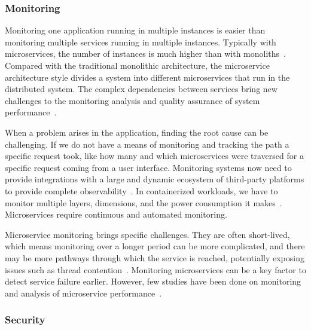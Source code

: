 \subsubsection{Monitoring}%


Monitoring one application running in multiple instances is easier than monitoring multiple services running in multiple instances. Typically with microservices, the number of instances is much higher than with monoliths~\cite{Kalske2017paper}. Compared with the traditional monolithic architecture, the microservice architecture style divides a system into different microservices that run in the distributed system. The complex dependencies between services bring new challenges to the monitoring analysis and quality assurance of system performance~\cite{Zhihui2020, Venugopal2017}.

When a problem arises in the application, finding the root cause can be challenging. If we do not have a means of monitoring and tracking the path a specific request took, like how many and which microservices were traversed for a specific request coming from a user interface. Monitoring systems now need to provide integrations with a large and dynamic ecosystem of third-party platforms to provide complete observability~\cite{Netflix}. In containerized workloads, we have to monitor multiple layers, dimensions, and the power consumption it makes~\cite{Kristiani2020}. Microservices require continuous and automated monitoring.

Microservice monitoring brings specific challenges. They are often short-lived, which means monitoring over a longer period can be more complicated, and there may be more pathways through which the service is reached, potentially exposing issues such as thread contention~\cite{Zhang2019}. Monitoring microservices can be a key factor to detect service failure earlier. However, few studies have been done on monitoring and analysis of microservice performance~\cite{Saman2017, Monterio2018}. 

\subsubsection{Security}%

